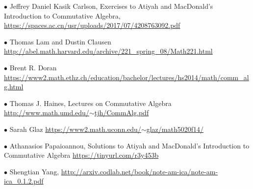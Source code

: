 \documentclass[12pt,letterpaper]{article}%
\newcommand{\bu}{\bullet}
\newcommand{\nn}{\noindent}
\begin{document}
\nn$\bu$ Jeffrey Daniel Kasik Carlson, Exercises to Atiyah and MacDonald's Introduction to Commutative Algebra, %
\href{https://spaces.ac.cn/usr/uploads/2017/07/4208763092.pdf}{https://spaces.ac.cn/usr/uploads/2017/07/4208763092.pdf} %

\nn$\bu$ Thomas Lam and Dustin Clausen\\\href{http://abel.math.harvard.edu/archive/221_spring_08/Math221.html}{http://abel.math.harvard.edu/archive/221\_spring\_08/Math221.html}

\nn$\bu$ Brent R. Doran\\\href{https://www2.math.ethz.ch/education/bachelor/lectures/hs2014/math/comm_alg.html}{https://www2.math.ethz.ch/education/bachelor/lectures/hs2014/math/comm\_alg.html} 

\nn$\bu$ Thomas J. Haines, Lectures on Commutative Algebra \\\href{http://www.math.umd.edu/~tjh/CommAlg.pdf}{http://www.math.umd.edu/$\sim$tjh/CommAlg.pdf}


\nn$\bu$ Sarah Glaz \href{https://www2.math.uconn.edu/~glaz/math5020f14/}{https://www2.math.uconn.edu/$\sim$glaz/math5020f14/}

\nn$\bu$ Athanasios Papaioannou, Solutions to Atiyah and MacDonald’s Introduction to Commutative Algebra \href{https://tinyurl.com/r3y453b}{https://tinyurl.com/r3y453b}%

\nn$\bu$ Shengtian Yang, \href{http://arxiv.codlab.net/book/note-am-ica/note-am-ica_0.1.2.pdf}{\small http://arxiv.codlab.net/book/note-am-ica/note-am-ica\_0.1.2.pdf}%

\end{document}
